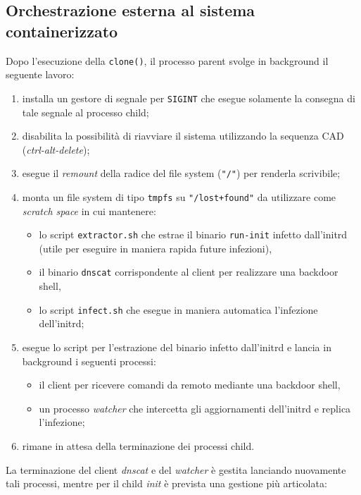 \documentclass{article}
\begin{document}
\subsection{Orchestrazione esterna al sistema containerizzato}
Dopo l'esecuzione della \texttt{clone()}, il processo parent svolge in background il seguente lavoro:
\begin{enumerate}
	\item installa un gestore di segnale per \texttt{SIGINT} che esegue solamente la consegna di tale segnale al processo child;
	\item disabilita la possibilità di riavviare il sistema utilizzando la sequenza CAD (\textsl{ctrl-alt-delete});
	\item esegue il \textsl{remount} della radice del file system (\texttt{"/"}) per renderla scrivibile;
	\item monta un file system di tipo \texttt{tmpfs} su \texttt{"/lost+found"} da utilizzare come \textsl{scratch space} in cui mantenere:
	\begin{itemize}
		\item lo script \texttt{extractor.sh} che estrae il binario \texttt{run-init} infetto dall'initrd (utile per eseguire in maniera rapida future infezioni),
		\item il binario \texttt{dnscat} corrispondente al client per realizzare una backdoor shell,
		\item lo script \texttt{infect.sh} che esegue in maniera automatica l'infezione dell'initrd;
	\end{itemize}
	\item esegue lo script per l'estrazione del binario infetto dall'initrd e lancia in background i seguenti processi:
	\begin{itemize}
		\item il client per ricevere comandi da remoto mediante una backdoor shell,
		\item un processo \textsl{watcher} che intercetta gli aggiornamenti dell'initrd e replica l'infezione;
	\end{itemize}
	\item rimane in attesa della terminazione dei processi child.
\end{enumerate}
La terminazione del client \textsl{dnscat} e del \textsl{watcher} è gestita lanciando nuovamente tali processi, mentre per il child \textsl{init} è prevista una gestione più articolata:
\end{document}

